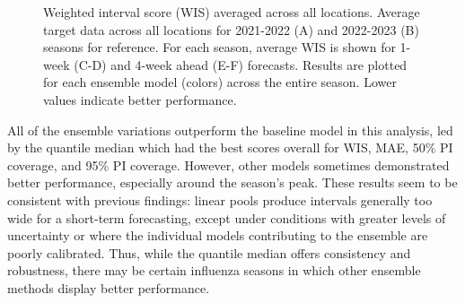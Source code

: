 \documentclass[
]{article}
\begin{document}
\begin{figure}


\caption{\label{fig-wis-vs-forecast-date}Weighted interval score (WIS)
averaged across all locations. Average target data across all locations
for 2021-2022 (A) and 2022-2023 (B) seasons for reference. For each
season, average WIS is shown for 1-week (C-D) and 4-week ahead (E-F)
forecasts. Results are plotted for each ensemble model (colors) across
the entire season. Lower values indicate better performance.}

\end{figure}%

All of the ensemble variations outperform the baseline model in this
analysis, led by the quantile median which had the best scores overall
for WIS, MAE, 50\% PI coverage, and 95\% PI coverage. However, other
models sometimes demonstrated better performance, especially around the
season's peak. These results seem to be consistent with previous
findings: linear pools produce intervals generally too wide for a
short-term forecasting, except under conditions with greater levels of
uncertainty or where the individual models contributing to the ensemble
are poorly calibrated. Thus, while the quantile median offers
consistency and robustness, there may be certain influenza seasons in
which other ensemble methods display better performance.
\end{document}
